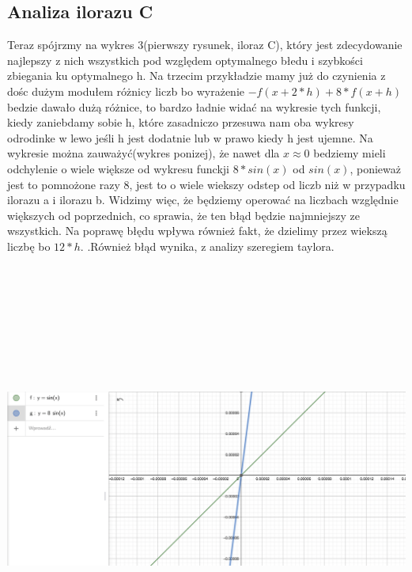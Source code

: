 \documentclass[12pt]{article}
\begin{document}
\subsection{Analiza ilorazu C}
Teraz spójrzmy na wykres 3(pierwszy rysunek, iloraz C), który jest zdecydowanie najlepszy z nich wszystkich pod względem optymalnego błedu i szybkości zbiegania ku optymalnego h. Na trzecim przykładzie mamy już do czynienia z dośc dużym modułem różnicy liczb bo wyrażenie $-f(x + 2*h) + 8*f(x + h)$ bedzie dawało dużą różnice, to bardzo ładnie widać na wykresie tych funkcji, kiedy zaniebdamy sobie h, które zasadniczo przesuwa nam oba wykresy odrodinke w lewo jeśli h jest dodatnie lub w prawo kiedy h jest ujemne. Na wykresie można zauważyć(wykres ponizej), że nawet dla $x \approx 0$ bedziemy mieli odchylenie o wiele większe od wykresu funckji $8*sin(x)$ od $sin(x)$, ponieważ jest to pomnożone razy 8, jest to o wiele wiekszy odstep od liczb niż w przypadku ilorazu a i ilorazu b. Widzimy więc, że będziemy operować na liczbach względnie większych od poprzednich, co sprawia, że ten błąd będzie najmniejszy ze wszystkich. Na poprawę błędu wpływa również fakt, że dzielimy przez wiekszą liczbę bo $12*h$. .Również błąd wynika, z analizy szeregiem taylora. 
\newline
\newline
\includegraphics[width=15cm,height=15cm, keepaspectratio]{wykres_sin}
\newline
\newline
\end{document}

